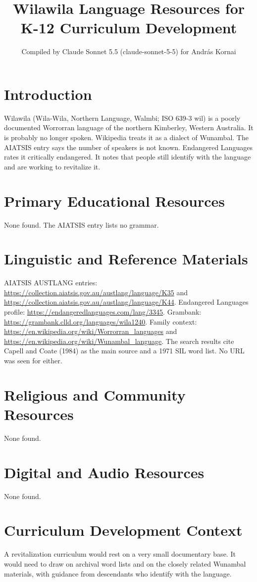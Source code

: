 \documentclass[12pt]{article}
\title{Wilawila Language Resources for K-12 Curriculum Development}
\author{Compiled by Claude Sonnet 5.5 (claude-sonnet-5-5) for Andr\'as Kornai}
\date{}
\begin{document}
\maketitle

\section{Introduction}
Wilawila (Wila-Wila, Northern Language, Walmbi; ISO 639-3 wil) is a poorly documented Worrorran language of the northern Kimberley, Western Australia. It is probably no longer spoken. Wikipedia treats it as a dialect of Wunambal. The AIATSIS entry says the number of speakers is not known. Endangered Languages rates it critically endangered. It notes that people still identify with the language and are working to revitalize it.

\section{Primary Educational Resources}
None found. The AIATSIS entry lists no grammar.

\section{Linguistic and Reference Materials}
AIATSIS AUSTLANG entries: \url{https://collection.aiatsis.gov.au/austlang/language/K35} and \url{https://collection.aiatsis.gov.au/austlang/language/K44}. Endangered Languages profile: \url{https://endangeredlanguages.com/lang/3345}. Grambank: \url{https://grambank.clld.org/languages/wila1240}. Family context: \url{https://en.wikipedia.org/wiki/Worrorran_languages} and \url{https://en.wikipedia.org/wiki/Wunambal_language}. The search results cite Capell and Coate (1984) as the main source and a 1971 SIL word list. No URL was seen for either.

\section{Religious and Community Resources}
None found.

\section{Digital and Audio Resources}
None found.

\section{Curriculum Development Context}
A revitalization curriculum would rest on a very small documentary base. It would need to draw on archival word lists and on the closely related Wunambal materials, with guidance from descendants who identify with the language.
\end{document}
